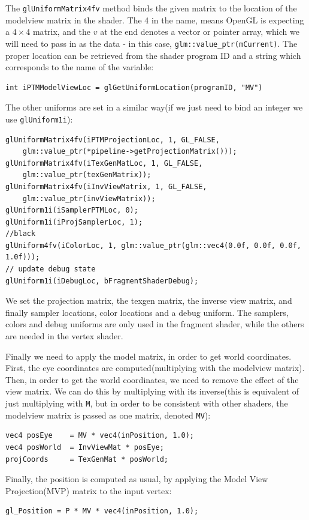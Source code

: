 \documentclass[]{article}
\begin{document}
The \verb|glUniformMatrix4fv| method binds the given matrix to the location of the modelview matrix in the shader. The 4 in the name, means OpenGL is expecting a $4 \times 4$ matrix, and the $v$ at the end denotes a vector or pointer array, which we will need to pass in as the data - in this case, \verb|glm::value_ptr(mCurrent)|. The proper location can be retrieved from the shader program ID and a string which corresponds to the name of the variable:
\begin{verbatim}
int iPTMModelViewLoc = glGetUniformLocation(programID, "MV")
\end{verbatim}
The other uniforms are set in a similar way(if we just need to bind an integer we use \verb|glUniform1i|):
\begin{verbatim}
glUniformMatrix4fv(iPTMProjectionLoc, 1, GL_FALSE, 
    glm::value_ptr(*pipeline->getProjectionMatrix()));
glUniformMatrix4fv(iTexGenMatLoc, 1, GL_FALSE, 
    glm::value_ptr(texGenMatrix));
glUniformMatrix4fv(iInvViewMatrix, 1, GL_FALSE, 
    glm::value_ptr(invViewMatrix));
glUniform1i(iSamplerPTMLoc, 0);
glUniform1i(iProjSamplerLoc, 1);
//black
glUniform4fv(iColorLoc, 1, glm::value_ptr(glm::vec4(0.0f, 0.0f, 0.0f, 1.0f)));
// update debug state
glUniform1i(iDebugLoc, bFragmentShaderDebug);
\end{verbatim}
We set the projection matrix, the texgen matrix, the inverse view matrix, and finally sampler locations, color locations and a debug uniform. The samplers, colors and debug uniforms are only used in the fragment shader, while the others are needed in the vertex shader. 


Finally we need to apply the model matrix, in order to get world coordinates. First, the eye coordinates are computed(multiplying with the modelview matrix). Then, in order to get the world coordinates, we need to remove the effect of the view matrix. We can do this by multiplying with its inverse(this is equivalent of just multiplying with \verb|M|, but in order to be consistent with other shaders, the modelview matrix is passed as one matrix, denoted \verb|MV|):
\begin{verbatim}
vec4 posEye    = MV * vec4(inPosition, 1.0);
vec4 posWorld  = InvViewMat * posEye;
projCoords     = TexGenMat * posWorld;
\end{verbatim}

Finally, the position is computed as usual, by applying the Model View Projection(MVP) matrix to the input vertex:
\begin{verbatim}
gl_Position = P * MV * vec4(inPosition, 1.0);
\end{verbatim}
\end{document}
